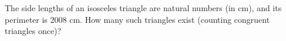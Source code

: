 The side lengths of an isosceles triangle are natural numbers (in cm), and its perimeter is $2008$ cm. How many such triangles exist (counting congruent triangles once)?
